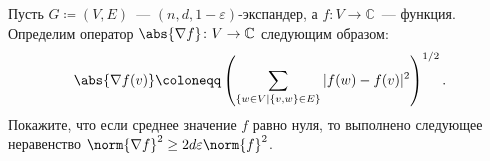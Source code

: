 Пусть $G \coloneqq (V, E)$~--- $(n, d, 1 - \varepsilon)$-экспандер, а $f \colon V \rightarrow
\mathbb{C}$~--- функция. Определим оператор $\abs{\nabla f} \colon V \rightarrow \mathbb{C}$ следующим
образом:
$$
    \abs{\nabla f(v)} \coloneqq
    \left(\sum\limits_{\{w \in V \mid \{v, w\} \in E\}} |f(w) - f(v)|^2\right)^{1 / 2}.
$$
Покажите, что если среднее значение $f$ равно нуля, то выполнено следующее неравенство $\norm{\nabla f}^2
\ge 2 d \varepsilon \norm{f}^2$.